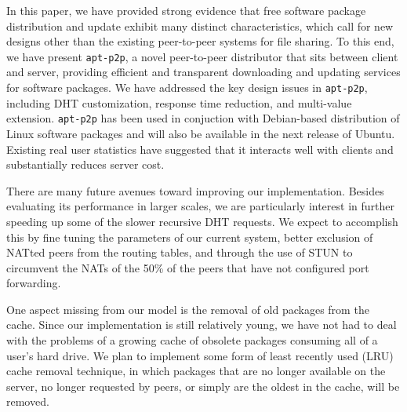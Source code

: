 \documentclass[conference]{IEEEtran}
\begin{document}
In this paper, we have provided strong evidence that free software package distribution 
and update exhibit many distinct characteristics, which call for new designs other
than the existing peer-to-peer systems for file sharing. To this end, we have 
present \texttt{apt-p2p}, a novel peer-to-peer distributor that sits between
client and server, providing efficient and transparent downloading and updating services
for software packages. We have addressed the key design issues in \texttt{apt-p2p}, including DHT customization,
response time reduction, and multi-value extension. \texttt{apt-p2p}  has been used in conjuction with Debian-based distribution of Linux
software packages and will also be available in the next release of Ubuntu. Existing real user statistics
have suggested that it interacts well with clients and substantially reduces server cost. 

There are many future avenues toward improving our implementation. Besides 
evaluating its performance in larger scales, we are particularly interest in further speeding up some of the slower recursive
DHT requests. We expect to accomplish this by fine tuning the
parameters of our current system, better exclusion of NATted peers
from the routing tables, and through the use of STUN \cite{STUN} to
circumvent the NATs of the 50\% of the peers that have not
configured port forwarding.

One aspect missing from our model is the removal of old packages
from the cache. Since our implementation is still relatively young,
we have not had to deal with the problems of a growing cache of
obsolete packages consuming all of a user's hard drive. We plan to
implement some form of least recently used (LRU) cache removal
technique, in which packages that are no longer available on the
server, no longer requested by peers, or simply are the oldest in
the cache, will be removed.





\end{document}
